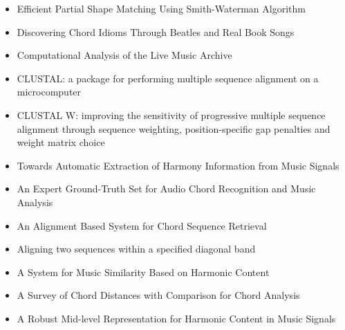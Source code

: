 \begin{itemize}
\item Efficient Partial Shape Matching Using Smith-Waterman Algorithm \cite{liu2012shape}
\item Discovering Chord Idioms Through Beatles and Real Book Songs \cite{mauch:dci}
\item Computational Analysis of the Live Music Archive \cite{bechhofer2014computational}
\item CLUSTAL: a package for performing multiple sequence alignment on a microcomputer \cite{higgins1988clustal}
\item CLUSTAL W: improving the sensitivity of progressive multiple sequence alignment through sequence weighting, position-specific gap penalties and weight matrix choice \cite{thompson1994clustal}
\item Towards Automatic Extraction of Harmony Information from Music Signals \cite{harte2010towards}
\item An Expert Ground-Truth Set for Audio Chord Recognition and Music Analysis \cite{BurgoyneEtAl_2011_AnExpeGrouSet}
\item An Alignment Based System for Chord Sequence Retrieval \cite{hanna2009alignment}
\item Aligning two sequences within a specified diagonal band \cite{chao1992aligning}
\item A System for Music Similarity Based on Harmonic Content \cite{BelloEtAl_2005_ARobuMidRepr}
\item A Survey of Chord Distances with Comparison for Chord Analysis \cite{rocher2010survey}
\item A Robust Mid-level Representation for Harmonic Content in Music Signals \cite{BelloEtAl_2005_ARobuMidRepr}
\end{itemize}